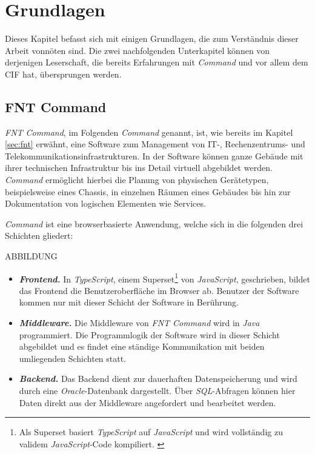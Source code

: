 
\chapter{Grundlagen}\label{ch:grundlagen}
Dieses Kapitel befasst sich mit einigen Grundlagen, die zum Verständnis dieser Arbeit vonnöten sind. Die zwei nachfolgenden Unterkapitel können von derjenigen Leserschaft, die bereits Erfahrungen mit \textit{Command} und vor allem dem \ac{CIF} hat, übersprungen werden.

\section{FNT Command}\label{sec:command}
\textit{FNT Command}, im Folgenden \textit{Command} genannt, ist, wie bereits im Kapitel \ref{sec:fnt} erwähnt, eine Software zum Management von IT-, Rechenzentrums- und Telekommunikationsinfrastrukturen. In der Software können ganze Gebäude mit ihrer technischen Infrastruktur bis ins Detail virtuell abgebildet werden. \textit{Command} ermöglicht hierbei die Planung von physischen Gerätetypen, beispielsweise eines Chassis, in einzelnen Räumen eines Gebäudes bis hin zur Dokumentation von logischen Elementen wie Services.

\textit{Command} ist eine browserbasierte Anwendung, welche sich in die folgenden drei Schichten gliedert:

ABBILDUNG

\begin{itemize}
    \item \textit{\textbf{Frontend.}} In \textit{TypeScript}, einem Superset\footnote{Als Superset basiert \textit{TypeScript} auf \textit{JavaScript} und wird vollständig zu validem \textit{JavaScript}-Code kompiliert. \cite{ts:2021}} von \textit{JavaScript}, geschrieben, bildet das Frontend die Benutzeroberfläche im Browser ab. Benutzer der Software kommen nur mit dieser Schicht der Software in Berührung.
    \item \textit{\textbf{Middleware.}} Die Middleware von \textit{FNT Command} wird in \textit{Java} programmiert. Die Programmlogik der Software wird in dieser Schicht abgebildet und es findet eine ständige Kommunikation mit beiden umliegenden Schichten statt.
    \item \textit{\textbf{Backend.}} Das Backend dient zur dauerhaften Datenspeicherung und wird durch eine \textit{Oracle}-Datenbank dargestellt. Über \textit{\ac{SQL}}-Abfragen können hier Daten direkt aus der Middleware angefordert und bearbeitet werden.
\end{itemize}

